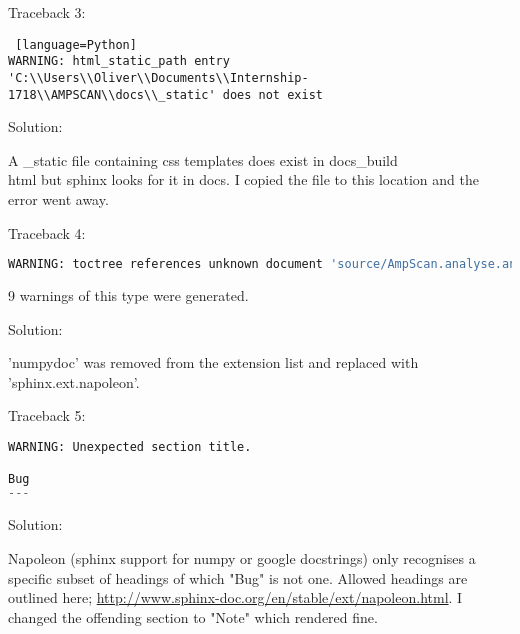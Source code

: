 \documentclass{article}
\begin{document}
Traceback 3:

\begin{lstlisting} [language=Python]
WARNING: html_static_path entry 'C:\\Users\\Oliver\\Documents\\Internship-1718\\AMPSCAN\\docs\\_static' does not exist
\end{lstlisting}

Solution:

A \_static file containing css templates does exist in docs\_build\\html but sphinx looks for it in docs. I copied the file to this location and the error went away.

Traceback 4:

\begin{lstlisting}[language=Python]
WARNING: toctree references unknown document 'source/AmpScan.analyse.analyseMixin.create_slices
\end{lstlisting}

9 warnings of this type were generated.

Solution:

'numpydoc' was removed from the extension list and replaced with 'sphinx.ext.napoleon'.

Traceback 5:

\begin{lstlisting}[language=Python]
WARNING: Unexpected section title.

Bug
---
\end{lstlisting}

Solution:

Napoleon (sphinx support for numpy or google docstrings) only recognises a specific subset of headings of which "Bug" is not one. Allowed headings are outlined here; \url{http://www.sphinx-doc.org/en/stable/ext/napoleon.html}. I changed the offending section to "Note" which rendered fine.
\end{document}

